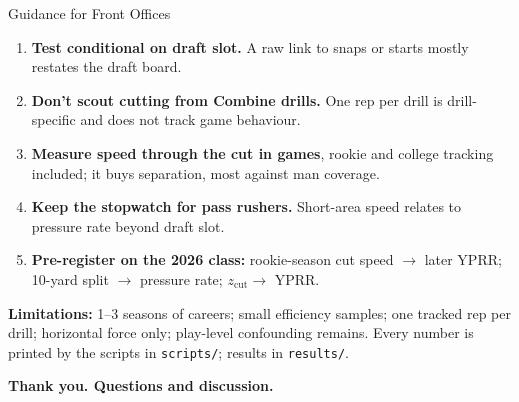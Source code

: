 \documentclass[aspectratio=169, 10pt]{beamer}
\begin{document}
\begin{frame}{Guidance for Front Offices}
  \small
  \begin{enumerate}
    \item \textbf{Test conditional on draft slot.} A raw link to snaps or starts mostly restates the draft board.
    \item \textbf{Don't scout cutting from Combine drills.} One rep per drill is drill-specific and does not track game behaviour.
    \item \textbf{Measure speed through the cut in games}, rookie and college tracking included; it buys separation, most against man coverage.
    \item \textbf{Keep the stopwatch for pass rushers.} Short-area speed relates to pressure rate beyond draft slot.
    \item \textbf{Pre-register on the 2026 class:} rookie-season cut speed $\to$ later YPRR; 10-yard split $\to$ pressure rate; $z_{\text{cut}} \to$ YPRR.
  \end{enumerate}
  \footnotesize
  \textbf{Limitations:} 1--3 seasons of careers; small efficiency samples; one tracked rep per drill; horizontal force only; play-level confounding remains.
  Every number is printed by the scripts in \texttt{scripts/}; results in \texttt{results/}.
  \vspace{0.3em}
  \begin{center}
    \textbf{Thank you. Questions and discussion.}
  \end{center}
\end{frame}
\end{document}
